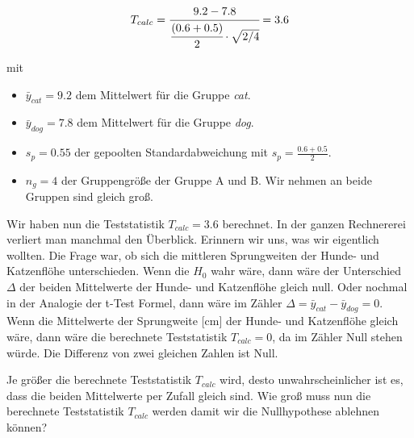 \documentclass[
  letterpaper,
]{scrbook}
\providecommand{\tightlist}{%
  \setlength{\itemsep}{0pt}\setlength{\parskip}{0pt}}\usepackage{longtable,booktabs,array}
\begin{document}
\[
T_{calc}=\cfrac{9.2 - 7.8}{\cfrac{(0.6 + 0.5)}{2} \cdot \sqrt{2/4}} = 3.6
\]

mit

\begin{itemize}
\tightlist
\item
  \(\bar{y}_{cat} = 9.2\) dem Mittelwert für die Gruppe \emph{cat}.
\item
  \(\bar{y}_{dog} = 7.8\) dem Mittelwert für die Gruppe \emph{dog}.
\item
  \(s_p = 0.55\) der gepoolten Standardabweichung mit
  \(s_p = \tfrac{0.6 + 0.5}{2}\).
\item
  \(n_g = 4\) der Gruppengröße der Gruppe A und B. Wir nehmen an beide
  Gruppen sind gleich groß.
\end{itemize}

Wir haben nun die Teststatistik \(T_{calc} = 3.6\) berechnet. In der
ganzen Rechnererei verliert man manchmal den Überblick. Erinnern wir
uns, was wir eigentlich wollten. Die Frage war, ob sich die mittleren
Sprungweiten der Hunde- und Katzenflöhe unterschieden. Wenn die \(H_0\)
wahr wäre, dann wäre der Unterschied \(\Delta\) der beiden Mittelwerte
der Hunde- und Katzenflöhe gleich null. Oder nochmal in der Analogie der
t-Test Formel, dann wäre im Zähler
\(\Delta = \bar{y}_{cat} - \bar{y}_{dog} = 0\). Wenn die Mittelwerte der
Sprungweite {[}cm{]} der Hunde- und Katzenflöhe gleich wäre, dann wäre
die berechnete Teststatistik \(T_{calc} = 0\), da im Zähler Null stehen
würde. Die Differenz von zwei gleichen Zahlen ist Null.

Je größer die berechnete Teststatistik \(T_{calc}\) wird, desto
unwahrscheinlicher ist es, dass die beiden Mittelwerte per Zufall gleich
sind. Wie groß muss nun die berechnete Teststatistik \(T_{calc}\) werden
damit wir die Nullhypothese ablehnen können?
\end{document}

